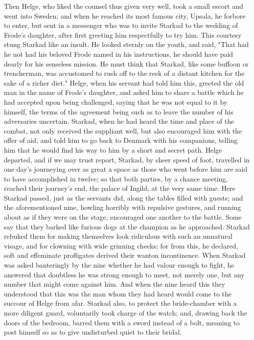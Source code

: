 \documentclass[10pt,a4paper]{report}
\begin{document}
Then Helge, who liked the counsel thus given very well, took a small escort and went into Sweden; and when he reached its most famous city, Upsala, he forbore to enter, but sent in a messenger who was to invite Starkad to the wedding of Frode's daughter, after first greeting him respectfully to try him. This courtesy stung Starkad like an insult. He looked sternly on the youth, and said, "That had he not had his beloved Frode named in his instructions, he should have paid dearly for his senseless mission. He must think that Starkad, like some buffoon or trencherman, was accustomed to rush off to the reek of a distant kitchen for the sake of a richer diet." Helge, when his servant had told him this, greeted the old man in the name of Frode's daughter, and asked him to share a battle which he had accepted upon being challenged, saying that he was not equal to it by himself, the terms of the agreement being such as to leave the number of his adversaries uncertain. Starkad, when he had heard the time and place of the combat, not only received the suppliant well, but also encouraged him with the offer of aid, and told him to go back to Denmark with his companions, telling him that he would find his way to him by a short and secret path. Helge departed, and if we may trust report, Starkad, by sheer speed of foot, travelled in one day's journeying over as great a space as those who went before him are said to have accomplished in twelve; so that both parties, by a chance meeting, reached their journey's end, the palace of Ingild, at the very same time. Here Starkad passed, just as the servants did, along the tables filled with guests; and the aforementioned nine, howling horribly with repulsive gestures, and running about as if they were on the stage, encouraged one another to the battle. Some say that they barked like furious dogs at the champion as he approached. Starkad rebuked them for making themselves look ridiculous with such an unnatural visage, and for clowning with wide grinning cheeks; for from this, he declared, soft and effeminate profligates derived their wanton incontinence. When Starkad was asked banteringly by the nine whether he had valour enough to fight, he answered that doubtless he was strong enough to meet, not merely one, but any number that might come against him. And when the nine heard this they understood that this was the man whom they had heard would come to the succour of Helge from afar. Starkad also, to protect the bride-chamber with a more diligent guard, voluntarily took charge of the watch; and, drawing back the doors of the bedroom, barred them with a sword instead of a bolt, meaning to post himself so as to give undisturbed quiet to their bridal.\\
\end{document}
